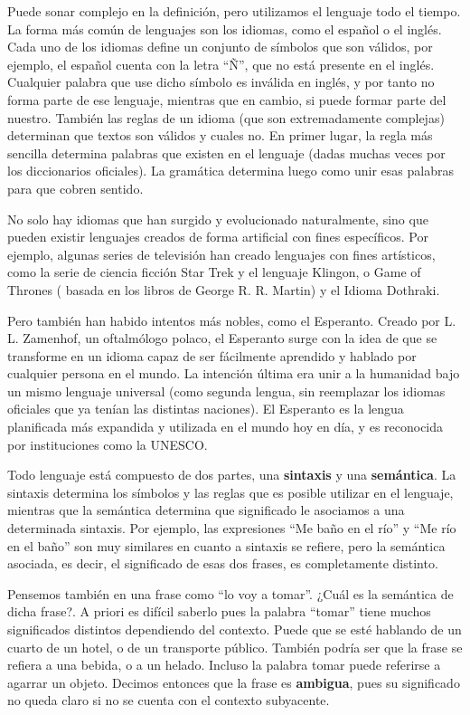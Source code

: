 Puede sonar complejo en la definición, pero utilizamos el lenguaje todo el
tiempo. La forma más común de lenguajes son los idiomas, como el español o el
inglés. Cada uno de los idiomas define un conjunto de símbolos que son válidos,
por ejemplo, el español cuenta con la letra ``Ñ'', que no está presente en el
inglés. Cualquier palabra que use dicho símbolo es inválida en inglés, y por
tanto no forma parte de ese lenguaje, mientras que en cambio, si puede formar
parte del nuestro. También las reglas de un idioma (que son extremadamente
complejas) determinan que textos son válidos y cuales no. En primer lugar, la
regla más sencilla determina palabras que existen en el lenguaje (dadas muchas
veces por los diccionarios oficiales). La gramática determina luego como unir
esas palabras para que cobren sentido.

No solo hay idiomas que han surgido y evolucionado naturalmente, sino que pueden
existir lenguajes creados de forma artificial con fines específicos. Por
ejemplo, algunas series de televisión han creado lenguajes con fines artísticos,
como la serie de ciencia ficción Star Trek y el lenguaje Klingon, o Game of
Thrones ( basada en los libros de George R. R. Martin) y el Idioma
Dothraki.\autocite{littaur_2017}

Pero también han habido intentos más nobles, como el Esperanto. Creado por L. L.
Zamenhof, un oftalmólogo polaco, el Esperanto surge con la idea de que se
transforme en un idioma capaz de ser fácilmente aprendido y hablado por
cualquier persona en el mundo. La intención última era unir a la humanidad bajo
un mismo lenguaje universal (como segunda lengua, sin reemplazar los idiomas
oficiales que ya tenían las distintas naciones). El Esperanto es la lengua
planificada más expandida y utilizada en el mundo hoy en día, y es reconocida
por instituciones como la UNESCO.

 Todo lenguaje está compuesto de dos partes,
una \textbf{sintaxis} y una \textbf{semántica}. La sintaxis determina los
símbolos y las reglas que es posible utilizar en el lenguaje, mientras que la
semántica determina que significado le asociamos a una determinada sintaxis. Por
ejemplo, las expresiones ``Me baño en el río'' y ``Me río en el baño'' son muy
similares en cuanto a sintaxis se refiere, pero la semántica asociada, es decir,
el significado de esas dos frases, es completamente distinto.

Pensemos también en una frase como ``lo voy a tomar''. ¿Cuál es la semántica de
dicha frase?. A priori es difícil saberlo pues la palabra ``tomar'' tiene muchos
significados distintos dependiendo del contexto. Puede que se esté hablando de
un cuarto de un hotel, o de un transporte público. También podría ser que la
frase se refiera a una bebida, o a un helado. Incluso la palabra tomar puede
referirse a agarrar un objeto. Decimos entonces que la frase es
\textbf{ambigua}, pues su significado no queda claro si no se cuenta con el
contexto subyacente.

